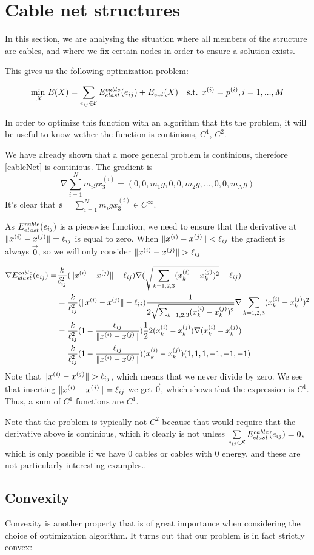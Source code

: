 \section{Cable net structures}
In this section, we are analysing the situation where all members of the structure are cables, and where we fix certain nodes in order to ensure a solution exists.

This gives us the following optimization problem:

\begin{equation}
    \underset{X}{\text{min }} E(X) = \sum\limits_{e_{ij} \in \mathcal{E}} E^{cable}_{elast}(e_{ij}) + E_{ext}(X) \quad \text{s.t. } x^{(i)} = p^{(i)}, i = 1,...,M
    \label{cableNet}
\end{equation}

In order to optimize this function with an algorithm that fits the problem, it will be useful to know wether the function is continious, $C^1$, $C^2$.

We have already shown that a more general problem is continious, therefore \eqref{cableNet} is continious. The gradient is 
\begin{equation}
    \nabla \sum_{i=1}^N m_i g x_3^{(i)}
    = (0,0,m_1 g, 0,0,m_2 g,...,0,0,m_N g)
    \label{gradient_external_force}
\end{equation}
It's clear that $\ee = \sum_{i=1}^N m_i g x_3^{(i)} \in C^{\infty}$. 

As $E^{cable}_{elast}(e_{ij})$ is a piecewise function, we need to ensure that the derivative at $\lVert x^{(i)} - x^{(j)}\rVert = \ell_{ij}$ is equal to zero. When $\lVert x^{(i)} - x^{(j)}\rVert < \ell_{ij}$ the gradient is always $\Vec{0}$, so we will only consider $\lVert x^{(i)} - x^{(j)}\rVert>\ell_{ij}$

\begin{align}
    \nabla E^{cable}_{elast}(e_{ij}) =  &\frac{k}{\ell_{ij}^2}(\lVert x^{(i)} - x^{(j)}\rVert - \ell_{ij}) \nabla (\sqrt{ \sum_{k= 1,2,3}(x_k^{(i)}-x_k^{(j)})^2}-\ell_{ij})\\&=\frac{k}{\ell_{ij}^2} (\lVert x^{(i)} - x^{(j)}\rVert - \ell_{ij}) \frac{1}{2\sqrt{\sum_{k=1,2,3}(x_k^{(i)}-x_k^{(j)})^2}}\nabla \sum_{k=1,2,3}(x_k^{(i)}-x_k^{(j)})^2\\ &= \frac{k}{\ell_{ij}^2} (1 - \frac{\ell_{ij}}{\lVert x^{(i)} - x^{(j)}\rVert}) \frac{1}{2} 2(x_k^{(i)} - x_k^{(j)}) \nabla (x_k^{(i)} - x_k^{(j)})\\ &= \frac{k}{\ell_{ij}^2} (1- \frac{\ell_{ij}}{\lVert x^{(i)} - x^{(j)}\rVert}) (x_k^{(i)} - x_k^{(j)}) ( 1, 1, 1,-1,-1,-1)
\end{align}
Note that $\lVert x^{(i)} - x^{(j)}\rVert>\ell_{ij}$, which means that we never divide by zero. We see that inserting $\lVert x^{(i)} - x^{(j)}\rVert = \ell_{ij}$ we get $\vec{0}$, which shows that the expression is $C^1$. Thus, a sum of $C^1$ functions are $C^1$.

Note that the problem is typically not $C^2$ because that would require that the derivative above is continious, which it clearly is not unless
$\sum\limits_{e_{ij} \in \mathcal{E}} E^{cable}_{elast}(e_{ij}) = 0$, which is only possible if we have $0$ cables or cables with $0$ energy, and these are not particularly interesting examples..

\subsection{Convexity}

Convexity is another property that is of great importance when considering the choice of optimization algorithm. It turns out that our problem is in fact strictly convex: 